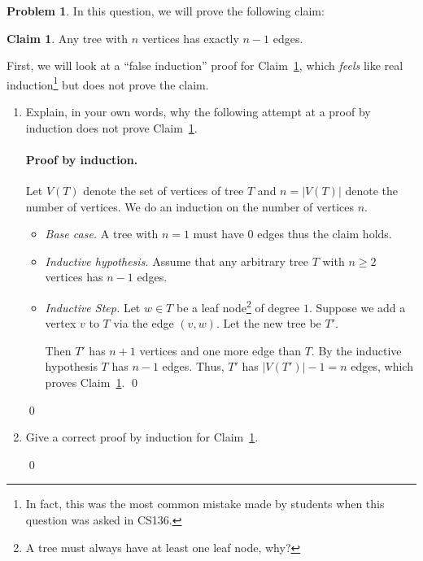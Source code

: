 \documentclass[12pt]{article}
\theoremstyle{definition}
\newtheorem{claim}{Claim}
\newtheorem{question}{Problem}
\newenvironment{solution}{\bigskip\noindent{\em Solution.}  \ignorespaces}{\hfill\qed}
\begin{document}
\begin{question}
In this question, we will prove the following claim:

\bigskip
\begin{tcolorbox}
\begin{claim}\label{induc}
Any tree with $n$ vertices has exactly $n-1$ edges.
\end{claim}
\end{tcolorbox}

\bigskip

First, we will look at a ``false induction'' proof for Claim~\ref{induc}, which {\em feels} like real induction\footnote{In fact,
this was the most common mistake made by students when this question was asked in CS136.} but does not prove the claim.

\begin{enumerate}[label = (\alph*)]
\item Explain, in your own words, why the following attempt at a proof by induction does not prove Claim~\ref{induc}.



\paragraph{Proof by induction.} Let $V(T)$ denote the set of vertices of tree $T$ and $n = |V(T)|$ denote the number of vertices.
We do an induction on the number of vertices $n$. 
\begin{itemize}
\item {\em Base case.} A tree with $n = 1$
must have $0$ edges thus the claim holds. %
\item {\em Inductive hypothesis.}  Assume that any arbitrary tree $T$ with $n \geq 2$ vertices has $n-1$ edges.  
\item {\em Inductive Step.} Let $w \in T$ be a leaf node\footnote{A tree must always have at least one leaf node, why?} of degree $1$.
Suppose we add a vertex $v$ to $T$ via the edge $(v, w)$. Let the new tree be $T'$.

Then $T'$ has $n+1$ vertices and one more edge than $T$.  By the inductive hypothesis $T$ has $n-1$ edges.
Thus, $T'$ has $|V(T')|-1 = n$ edges,
which proves Claim~\ref{induc}.  \qed
\end{itemize}

\begin{solution}
\end{solution}

\item Give a correct proof by induction for Claim~\ref{induc}.


\begin{solution}
\end{solution}

\end{enumerate}
\end{question}
\end{document}
